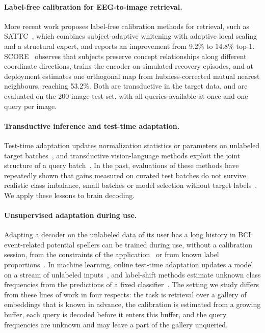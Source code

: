 \documentclass[10pt,twocolumn,letterpaper]{article}
\begin{document}
\paragraph{Label-free calibration for EEG-to-image retrieval.}
More recent work proposes label-free calibration methods for retrieval, such as 
SATTC~\cite{huang2026sattc}, which combines subject-adaptive whitening with adaptive local scaling and a structural expert, and reports an improvement from 9.2\% to 14.8\% top-1. SCORE~\cite{cui2026score} observes that subjects preserve concept relationships along different coordinate directions, trains the encoder on simulated recovery episodes, and at deployment estimates one orthogonal map from hubness-corrected mutual nearest neighbours, reaching 53.2\%. Both are transductive in the target data, and are evaluated on the 200-image test set, with all queries available at once and one query per image.

\paragraph{Transductive inference and test-time adaptation.}
Test-time adaptation updates normalization statistics or parameters on unlabeled target batches~\cite{li2018adabn,wang2021tent,liang2020shot,iwasawa2021t3a}, and transductive vision-language methods exploit the joint structure of a query batch~\cite{martin2024transductive,zanella2024transclip}. In the past, evaluations of these methods have repeatedly shown that gains measured on curated test batches do not survive realistic class imbalance, small batches or model selection without target labels~\cite{veilleux2021realistic,zhao2023pitfalls}. We apply these lessons to brain decoding.

\paragraph{Unsupervised adaptation during use.}
Adapting a decoder on the unlabeled data of its user has a long history in BCI: event-related potential spellers can be trained during use, without a calibration session, from the constraints of the application~\cite{kindermans2012bayesian} or from known label proportions~\cite{huebner2017learning}. In machine learning, online test-time adaptation updates a model on a stream of unlabeled inputs~\cite{wang2022cotta,gong2022note}, and label-shift methods estimate unknown class frequencies from the predictions of a fixed classifier~\cite{lipton2018bbse}. The setting we study differs from these lines of work in four respects: the task is retrieval over a gallery of embeddings that is known in advance, the calibration is estimated from a growing buffer, each query is decoded before it enters this buffer, and the query frequencies are unknown and may leave a part of the gallery unqueried.
\end{document}
